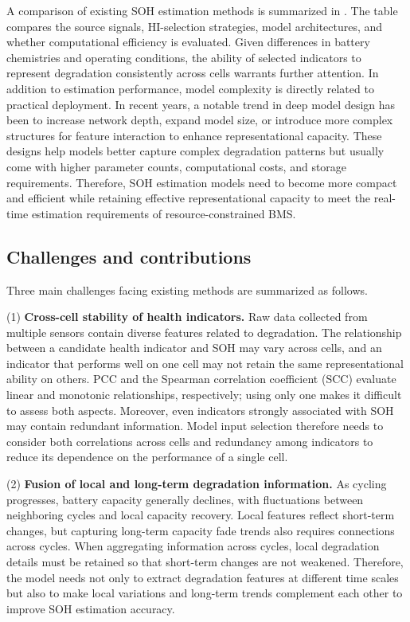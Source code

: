 A comparison of existing SOH estimation methods is summarized in . The table compares the source signals, HI-selection strategies, model architectures, and whether computational efficiency is evaluated. Given differences in battery chemistries and operating conditions, the ability of selected indicators to represent degradation consistently across cells warrants further attention. In addition to estimation performance, model complexity is directly related to practical deployment. In recent years, a notable trend in deep model design has been to increase network depth, expand model size, or introduce more complex structures for feature interaction to enhance representational capacity. These designs help models better capture complex degradation patterns but usually come with higher parameter counts, computational costs, and storage requirements. Therefore, SOH estimation models need to become more compact and efficient while retaining effective representational capacity to meet the real-time estimation requirements of resource-constrained BMS.


\FloatBarrier

\subsection{Challenges and contributions}

Three main challenges facing existing methods are summarized as follows.

(1) \textbf{Cross-cell stability of health indicators.} Raw data collected from multiple sensors contain diverse features related to degradation. The relationship between a candidate health indicator and SOH may vary across cells, and an indicator that performs well on one cell may not retain the same representational ability on others. PCC and the Spearman correlation coefficient (SCC) evaluate linear and monotonic relationships, respectively; using only one makes it difficult to assess both aspects. Moreover, even indicators strongly associated with SOH may contain redundant information. Model input selection therefore needs to consider both correlations across cells and redundancy among indicators to reduce its dependence on the performance of a single cell.

(2) \textbf{Fusion of local and long-term degradation information.} As cycling progresses, battery capacity generally declines, with fluctuations between neighboring cycles and local capacity recovery. Local features reflect short-term changes, but capturing long-term capacity fade trends also requires connections across cycles. When aggregating information across cycles, local degradation details must be retained so that short-term changes are not weakened. Therefore, the model needs not only to extract degradation features at different time scales but also to make local variations and long-term trends complement each other to improve SOH estimation accuracy.

